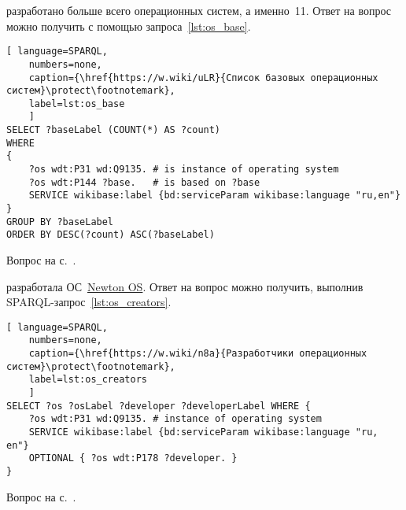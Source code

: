 \newpage
\hfil{}\hfil%

\begin{task}
\label{answer:os_base}
    разработано больше всего операционных систем, а именно~11. 
    Ответ на вопрос можно получить с помощью запроса~\ref{lst:os_base}.

\begin{lstlisting}[ language=SPARQL, 
    numbers=none,
    caption={\href{https://w.wiki/uLR}{Список базовых операционных систем}\protect\footnotemark},
	label=lst:os_base
	]
SELECT ?baseLabel (COUNT(*) AS ?count)
WHERE
{
	?os wdt:P31 wd:Q9135. # is instance of operating system
	?os wdt:P144 ?base.   # is based on ?base
	SERVICE wikibase:label {bd:serviceParam wikibase:language "ru,en"}
}
GROUP BY ?baseLabel
ORDER BY DESC(?count) ASC(?baseLabel)\end{lstlisting}

\small{\AnswerBackref Вопрос на с.~\pageref{lst:base_of_operating_systems}.}
\end{task}



\begin{task}
\label{answer:what_system_created}
 разработала ОС~\href{https://w.wiki/n8P}{Newton OS}. Ответ на вопрос можно получить, выполнив SPARQL-запрос~\ref{lst:os_creators}.

\begin{lstlisting}[ language=SPARQL, 
    numbers=none,
    caption={\href{https://w.wiki/n8a}{Разработчики операционных систем}\protect\footnotemark},
	label=lst:os_creators
	]
SELECT ?os ?osLabel ?developer ?developerLabel WHERE {
	?os wdt:P31 wd:Q9135. # instance of operating system
	SERVICE wikibase:label {bd:serviceParam wikibase:language "ru, en"}
	OPTIONAL { ?os wdt:P178 ?developer. }
}\end{lstlisting}

\small{\AnswerBackref Вопрос на с.~\pageref{lst:inception_time_of_operating_systems}.}
\end{task}




